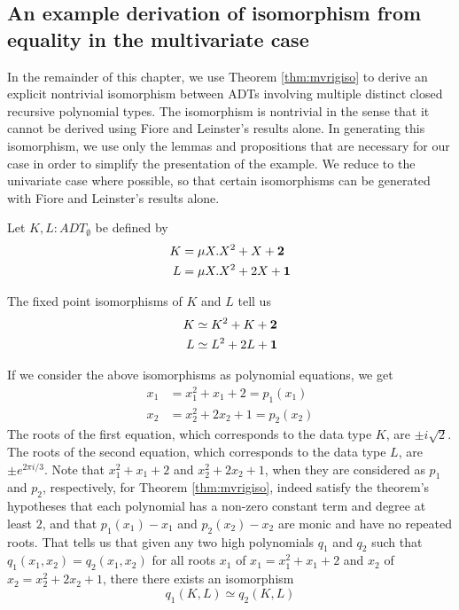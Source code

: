 \documentclass{msthesis}
\theoremstyle{definition}
\begin{document}
\subsection{An example derivation of isomorphism from equality in the multivariate case}

In the remainder of this chapter, we use Theorem \ref{thm:mvrigiso} to derive an explicit nontrivial isomorphism between ADTs involving multiple distinct closed recursive polynomial types.  The isomorphism is nontrivial in the sense that it cannot be derived using Fiore and Leinster's results alone.  In generating this isomorphism, we use only the lemmas and propositions that are necessary for our case in order to simplify the presentation of the example.  We reduce to the univariate case where possible, so that certain isomorphisms can be generated with Fiore and Leinster's results alone.

Let $K, L : ADT_\emptyset$ be defined by
\begin{align*}
    K &= \mu X.X^2 + X + \mathbf{2}  \\
    L &= \mu X.X^2 + 2X + \mathbf{1}
\end{align*}

The fixed point isomorphisms of $K$ and $L$ tell us
\begin{align*}
    K &\simeq K^2 + K + \mathbf{2} \\
    L &\simeq L^2 + 2L + \mathbf{1}
\end{align*}

If we consider the above isomorphisms as polynomial equations, we get
\begin{align*}
    x_1 &= x_1^2 + x_1 + 2 = p_1(x_1) \\
    x_2 &= x_2^2 + 2x_2 + 1 = p_2(x_2)
\end{align*}
The roots of the first equation, which corresponds to the data type $K$, are $\pm i\sqrt{2}$.  The roots of the second equation, which corresponds to the data type $L$, are $\pm e^{2 \pi i/3}$.  Note that $x_1^2+x_1+2$ and $x_2^2+2x_2+1$, when they are considered as $p_1$ and $p_2$, respectively, for Theorem \ref{thm:mvrigiso}, indeed satisfy the theorem's hypotheses that each polynomial has a non-zero constant term and degree at least $2$, and that $p_1(x_1) - x_1$ and $p_2(x_2) - x_2$ are monic and have no repeated roots.  That tells us that given any two high polynomials $q_1$ and $q_2$ such that $q_1(x_1, x_2) = q_2(x_1,x_2)$ for all roots $x_1$ of $x_1 = x_1^2 + x_1 + 2$ and $x_2$ of $x_2 = x_2^2 + 2x_2 + 1$, there there exists an isomorphism
\[ q_1(K, L) \simeq q_2(K, L)\]
\end{document}
